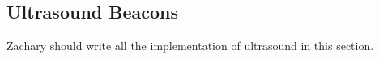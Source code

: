 \subsection{Ultrasound Beacons}
\label{sec:ultrasound-beacons}

Zachary should write all the implementation of ultrasound in this section.

